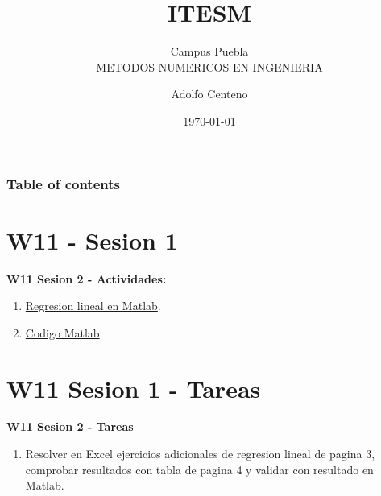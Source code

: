 \documentclass{beamer}
\begin{document}
\title{ITESM}  
\subtitle{Campus Puebla\\METODOS NUMERICOS EN INGENIERIA
}
\author{Adolfo Centeno}
\date{\today} 


\begin{frame}
\titlepage
\end{frame}

\begin{frame}\frametitle{Table of contents}
\tableofcontents
\end{frame} 


\section{W11 - Sesion 1 }

\begin{frame}

\textbf{W11 Sesion 2 - Actividades:}

\begin{enumerate}
\item
	 \href{https://la.mathworks.com/help/matlab/data_analysis/linear-regression.html?lang=en}{Regresion lineal en Matlab}.

\item
	 \href{https://github.com/adsoftsito/metodos-numericos/blob/master/w11/reglineal.pdf}{Codigo Matlab}.

\end{enumerate} 

\end{frame}


\section{W11 Sesion 1 - Tareas }

\begin{frame}


\textbf{W11 Sesion 2 - Tareas}


\begin{enumerate}
\item

Resolver en Excel ejercicios adicionales de regresion lineal de pagina 3, comprobar resultados con tabla de pagina 4 y
validar con resultado en Matlab.


\end{enumerate} 


\end{frame}
\end{document}
